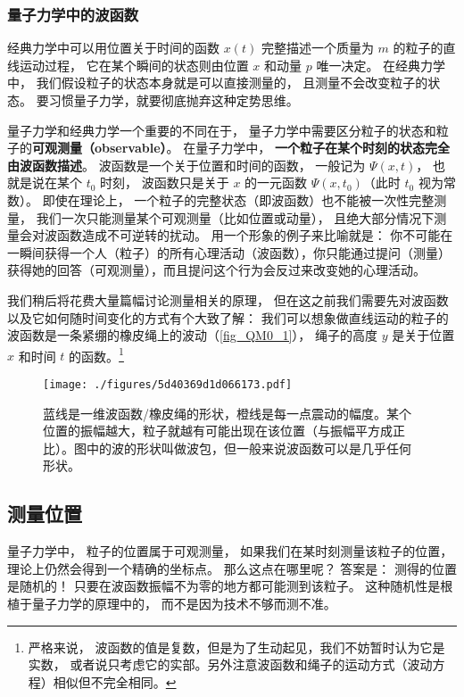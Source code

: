 \subsubsection{量子力学中的波函数}

经典力学中可以用位置关于时间的函数 $x(t)$ 完整描述一个质量为 $m$ 的粒子的直线运动过程， 它在某个瞬间的状态则由位置 $x$ 和动量 $p$ 唯一决定。 在经典力学中， 我们假设粒子的状态本身就是可以直接测量的， 且测量不会改变粒子的状态。 要习惯量子力学，就要彻底抛弃这种定势思维。

量子力学和经典力学一个重要的不同在于， 量子力学中需要区分粒子的状态和粒子的\textbf{可观测量（observable）}。 在量子力学中， \textbf{一个粒子在某个时刻的状态完全由波函数描述}。 波函数是一个关于位置和时间的函数， 一般记为 $\Psi(x, t)$， 也就是说在某个 $t_0$ 时刻， 波函数只是关于 $x$ 的一元函数 $\Psi(x, t_0)$（此时 $t_0$ 视为常数）。 即使在理论上， 一个粒子的完整状态（即波函数）也不能被一次性完整测量， 我们一次只能测量某个可观测量（比如位置或动量）， 且绝大部分情况下测量会对波函数造成不可逆转的扰动。 用一个形象的例子来比喻就是： 你不可能在一瞬间获得一个人（粒子）的所有心理活动（波函数），你只能通过提问（测量）获得她的回答（可观测量），而且提问这个行为会反过来改变她的心理活动。

我们稍后将花费大量篇幅讨论测量相关的原理， 但在这之前我们需要先对波函数以及它如何随时间变化的方式有个大致了解： 我们可以想象做直线运动的粒子的波函数是一条紧绷的橡皮绳上的波动（\autoref{fig_QM0_1}）， 绳子的高度 $y$ 是关于位置 $x$ 和时间 $t$ 的函数。\footnote{严格来说， 波函数的值是复数，但是为了生动起见，我们不妨暂时认为它是实数， 或者说只考虑它的实部。另外注意波函数和绳子的运动方式（波动方程）相似但不完全相同。}

\begin{figure}[ht]
\centering
\texttt{[image: ./figures/5d40369d1d066173.pdf]}
\caption{蓝线是一维波函数/橡皮绳的形状，橙线是每一点震动的幅度。某个位置的振幅越大，粒子就越有可能出现在该位置（与振幅平方成正比）。图中的波的形状叫做波包，但一般来说波函数可以是几乎任何形状。} \label{fig_QM0_1}
\end{figure}

\subsection{测量位置}

量子力学中， 粒子的位置属于可观测量， 如果我们在某时刻测量该粒子的位置， 理论上仍然会得到一个精确的坐标点。 那么这点在哪里呢？ 答案是： 测得的位置是随机的！ 只要在波函数振幅不为零的地方都可能测到该粒子。 这种随机性是根植于量子力学的原理中的， 而不是因为技术不够而测不准。

